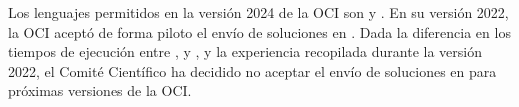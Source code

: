 {\new Los lenguajes permitidos en la versión 2024 de la OCI son \cpp y \java.}
%
En su versión 2022, la OCI aceptó de forma piloto el envío de soluciones en \python.
%
Dada la diferencia en los tiempos de ejecución entre \python, \cpp y \java, y la experiencia
recopilada durante la versión 2022, el Comité Científico ha decidido no aceptar
el envío de soluciones en \python para próximas versiones de la OCI.
